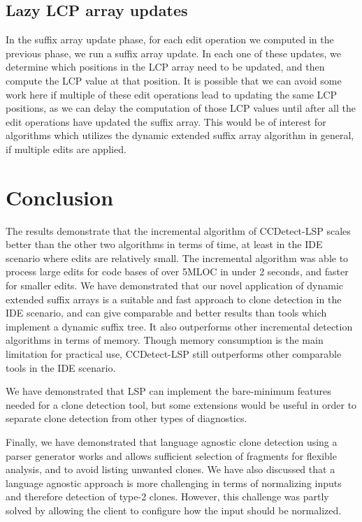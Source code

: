 \subsection*{Lazy LCP array updates}

In the suffix array update phase, for each edit operation we computed in the previous
phase, we run a suffix array update. In each one of these updates, we determine which
positions in the LCP array need to be updated, and then compute the LCP value at that
position. It is possible that we can avoid some work here if multiple of these edit
operations lead to updating the same LCP positions, as we can delay the computation of
those LCP values until after all the edit operations have updated the suffix array. This
would be of interest for algorithms which utilizes the dynamic extended suffix array
algorithm in general, if multiple edits are applied.

\section{Conclusion}

The results demonstrate that the incremental algorithm of CCDetect-LSP scales better than
the other two algorithms in terms of time, at least in the IDE scenario where edits are
relatively small. The incremental algorithm was able to process large edits for code bases
of over 5MLOC in under 2 seconds, and faster for smaller edits. We have demonstrated that
our novel application of dynamic extended suffix arrays is a suitable and fast approach to
clone detection in the IDE scenario, and can give comparable and better results than tools
which implement a dynamic suffix tree. It also outperforms other incremental detection
algorithms in terms of memory. Though memory consumption is the main limitation for
practical use, CCDetect-LSP still outperforms other comparable tools in the IDE scenario.

We have demonstrated that LSP can implement the bare-minimum features needed for a clone
detection tool, but some extensions would be useful in order to separate clone detection
from other types of diagnostics.

Finally, we have demonstrated that language agnostic clone detection using a parser
generator works and allows sufficient selection of fragments for flexible analysis, and to
avoid listing unwanted clones. We have also discussed that a language agnostic approach is
more challenging in terms of normalizing inputs and therefore detection of type-2 clones.
However, this challenge was partly solved by allowing the client to configure how the
input should be normalized.

